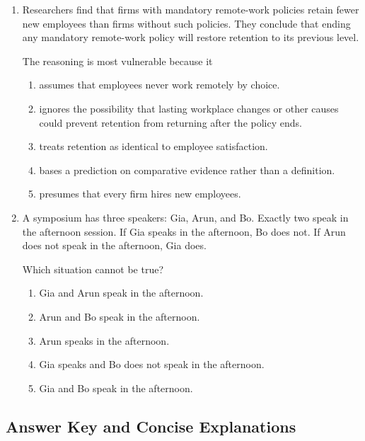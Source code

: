 \begin{enumerate}
\item Researchers find that firms with mandatory remote-work policies retain fewer new employees than firms without such policies. They conclude that ending any mandatory remote-work policy will restore retention to its previous level.

The reasoning is most vulnerable because it
\begin{enumerate}
\item[(A)] assumes that employees never work remotely by choice.
\item[(B)] ignores the possibility that lasting workplace changes or other causes could prevent retention from returning after the policy ends.
\item[(C)] treats retention as identical to employee satisfaction.
\item[(D)] bases a prediction on comparative evidence rather than a definition.
\item[(E)] presumes that every firm hires new employees.
\end{enumerate}

\item A symposium has three speakers: Gia, Arun, and Bo. Exactly two speak in the afternoon session. If Gia speaks in the afternoon, Bo does not. If Arun does not speak in the afternoon, Gia does.

Which situation cannot be true?
\begin{enumerate}
\item[(A)] Gia and Arun speak in the afternoon.
\item[(B)] Arun and Bo speak in the afternoon.
\item[(C)] Arun speaks in the afternoon.
\item[(D)] Gia speaks and Bo does not speak in the afternoon.
\item[(E)] Gia and Bo speak in the afternoon.
\end{enumerate}

\end{enumerate}

\subsection*{Answer Key and Concise Explanations}

